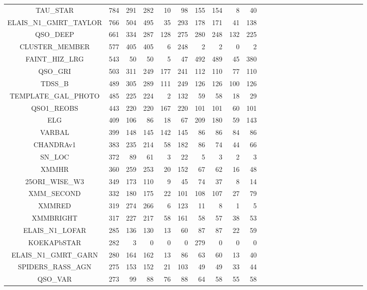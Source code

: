 \documentclass[onecolumn]{aa}
\begin{document}
\begin{center}
\begin{longtable}{c r rrrr rrrr rrrrr rrrrr rrrrr}
TAU\_STAR 		& 784    & 291 & 282 & 10 & 98 		  & 155 & 154 & 8 & 40 \\ 
ELAIS\_N1\_GMRT\_TAYLOR & 766    & 504 & 495 & 35 & 293		  & 178 & 171 & 41 & 138 \\ 
QSO\_DEEP 		& 661    & 334 & 287 & 128 & 275 	  & 280 & 248 & 132 & 225 \\ 
CLUSTER\_MEMBER 	& 577    & 405 & 405 & 6 & 248 		  & 2 & 2 & 0 & 2 \\ 
FAINT\_HIZ\_LRG 	& 543    & 50 & 50 & 5 & 47 		  & 492 & 489 & 45 & 380 \\ 
QSO\_GRI 		& 503    & 311 & 249 & 177 & 241 	  & 112 & 110 & 77 & 110 \\ 
TDSS\_B 		& 489    & 305 & 289 & 111 & 249 	  & 126 & 126 & 100 & 126 \\ 
TEMPLATE\_GAL\_PHOTO 	& 485    & 225 & 224 & 2 & 132 		  & 59 & 58 & 18 & 29 \\ 
QSO1\_REOBS 		& 443    & 220 & 220 & 167 & 220 	  & 101 & 101 & 60 & 101 \\ 
ELG 			& 409    & 106 & 86 & 18 & 67 		  & 209 & 180 & 59 & 143 \\ 
VARBAL 			& 399    & 148 & 145 & 142 & 145 	  & 86 & 86 & 84 & 86 \\ 
CHANDRAv1 		& 383    & 235 & 214 & 58 & 182 		  & 86 & 74 & 44 & 66 \\ 
SN\_LOC 		& 372    & 89 & 61 & 3 & 22 		  & 5 & 3 & 2 & 3 \\ 
XMMHR 			& 360    & 259 & 253 & 20 & 152 		  & 67 & 62 & 16 & 48 \\ 
25ORI\_WISE\_W3 	& 349    & 173 & 110 & 9 & 45 		  & 74 & 37 & 8 & 14 \\ 
XMM\_SECOND 		& 332    & 180 & 175 & 22 & 101 		  & 108 & 107 & 27 & 79 \\ 
XMMRED			& 319    & 274 & 266 & 6 & 123 		  & 11 & 8 & 1 & 5 \\ 
XMMBRIGHT 		& 317    & 227 & 217 & 58 & 161 		  & 58 & 57 & 38 & 53 \\ 
ELAIS\_N1\_LOFAR 	& 285    & 136 & 130 & 13 & 60 		  & 87 & 87 & 22 & 59 \\ 
KOEKAPbSTAR 		& 282    & 3 & 0 & 0 & 0 		  & 279 & 0 & 0 & 0 \\ 
ELAIS\_N1\_GMRT\_GARN 	& 280    & 164 & 162 & 13 & 86 		  & 63 & 60 & 13 & 40 \\ 
SPIDERS\_RASS\_AGN 	& 275    & 153 & 152 & 21 & 103 		  & 49 & 49 & 33 & 44 \\ 
QSO\_VAR 		& 273    & 99 & 88 & 76 & 88 		  & 64 & 58 & 55 & 58 \\ 

\end{longtable}
\end{center}
\end{document}
